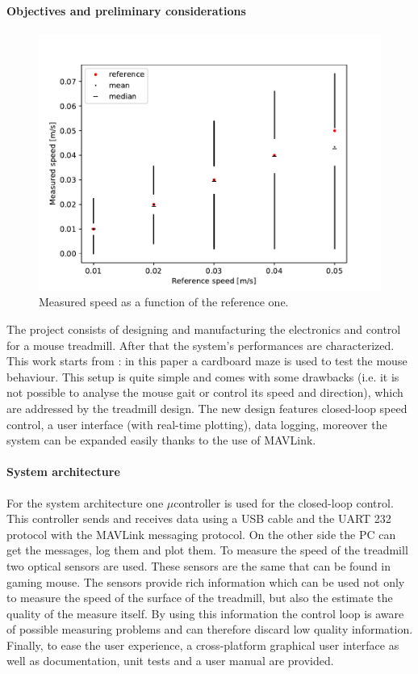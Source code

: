 \documentclass[12pt,a4paper, twoside]{article}
\begin{document}
\begin{multicols}{2}
[]

\paragraph{Objectives and preliminary considerations} 
\lfoot{\today}
\begin{figure}[H]
	\centering
	\includegraphics[width=0.95\linewidth]{fig/steady_state}
	\caption{Measured speed as a function of the reference one.}\label{fig:steady_state_0}
\end{figure}
The project consists of designing and manufacturing the electronics and control for a mouse treadmill. After that the system's performances are characterized. This work starts from \cite{Ole}: in this paper a cardboard maze is used to test the mouse behaviour. This setup is quite simple and comes with some drawbacks (i.e. it is not possible to analyse the mouse gait or control its speed and direction), which are addressed by the treadmill design. The new design features closed-loop speed control, a user interface (with real-time plotting), data logging, moreover the system can be expanded easily thanks to the use of MAVLink.

\paragraph{System architecture}
 For the system architecture one $\mu$controller is used for the closed-loop control. This controller sends and receives data using a USB cable and the UART 232 protocol with the MAVLink messaging protocol. On the other side the PC can get the messages, log them and plot them. To measure the speed of the treadmill two optical sensors are used. These sensors are the same that can be found in gaming mouse. The sensors provide rich information which can be used not only to measure the speed of the surface of the treadmill, but also the estimate the quality of the measure itself. By using this information the control loop is aware of possible measuring problems and can therefore discard low quality information.\\
 Finally, to ease the user experience, a cross-platform graphical user interface as well as documentation, unit tests and a user manual are provided. 
 

\end{multicols}
\end{document}
